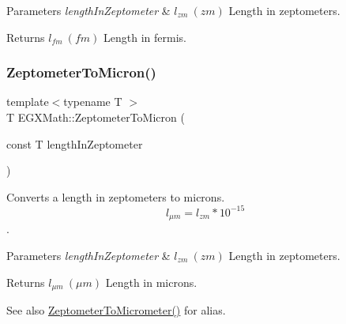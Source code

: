 \begin{DoxyParams}{Parameters}
{\em length\+In\+Zeptometer} & $ l_{zm}\ (zm)$ Length in zeptometers. \\
\hline
\end{DoxyParams}
\begin{DoxyReturn}{Returns}
$ l_{fm}\ (fm)$ Length in fermis. 
\end{DoxyReturn}
\mbox{\label{group___e_g_x_math-_conversions-_length_conversions-_s_i-_zeptometer-_non-_s_i_ga0bd42e8489b135f27530a247193286da}} 
\subsubsection{\texorpdfstring{Zeptometer\+To\+Micron()}{ZeptometerToMicron()}}
{\footnotesize\ttfamily template$<$typename T $>$ \\
T E\+G\+X\+Math\+::\+Zeptometer\+To\+Micron (\begin{DoxyParamCaption}\item[{const T}]{length\+In\+Zeptometer }\end{DoxyParamCaption})}



Converts a length in zeptometers to microns. \[ l_{\mu m}=l_{zm} * 10^{-15} \]. 


\begin{DoxyParams}{Parameters}
{\em length\+In\+Zeptometer} & $ l_{zm}\ (zm)$ Length in zeptometers. \\
\hline
\end{DoxyParams}
\begin{DoxyReturn}{Returns}
$ l_{\mu m}\ (\mu m)$ Length in microns. 
\end{DoxyReturn}
\begin{DoxySeeAlso}{See also}
\mbox{\hyperlink{group___e_g_x_math-_conversions-_length_conversions-_s_i-_zeptometer-_s_i_ga3ff7c51338abdb80d18becf7245a32fd}{Zeptometer\+To\+Micrometer()}} for alias. 
\end{DoxySeeAlso}
\mbox{\label{group___e_g_x_math-_conversions-_length_conversions-_s_i-_zeptometer-_non-_s_i_gaa621a874847d7e6aae8d04395c68a313}} 
